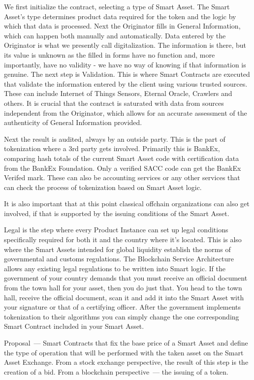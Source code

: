 \documentclass{article}
\begin{document}
\begin{multicols}{2}
We first initialize the contract, selecting a type of Smart Asset. The Smart Asset’s type determines product data required for the token and the logic by which that data is processed. 
Next the Originator fills in General Information, which can happen both manually and automatically. Data entered by the Originator is what we presently call digitalization. The information is there, but its value is unknown as the filled in forms have no function and, more importantly, have no validity - we have no way of knowing if that information is genuine. 
The next step is Validation. This is where Smart Contracts are executed that validate the information entered by the client using various trusted sources. These can include Internet of Things Sensors, Eternal Oracle, Crawlers and others. It is crucial that the contract is saturated with data from sources independent from the Originator, which allows for an accurate assessment of the authenticity of General Information provided. 

Next the result is audited, always by an outside party. This is the part of tokenization where a 3rd party gets involved. Primarily this is BankEx, comparing hash totals of the current Smart Asset code with certification data from the BankEx Foundation. Only a verified SACC code can get the BankEx Verifed mark. These can also be accounting services or any other services that can check the process of tokenization based on Smart Asset logic.

It is also important that at this point classical offchain organizations can also get involved, if that is supported by the issuing conditions of the Smart Asset. 

Legal is the step where every Product Instance can set up legal conditions specifically required for both it and the country where it's located. This is also where the Smart Assets intended for global liquidity establish the norms of governmental and customs regulations. The Blockchain Service Architecture allows any existing legal regulations to be written into Smart logic. If the government of your country demands that you must receive an official document from the town hall for your asset, then you do just that. You head to the town hall, receive the official document, scan it and add it into the Smart Asset with your signature or that of a certifying officer. After the government implements tokenization to their algorithms you can simply change the one corresponding Smart Contract included in your Smart Asset. 

Proposal~--- Smart Contracts that fix the base price of a Smart Asset and define the type of operation that will be performed with the taken asset on the Smart Asset Exchange. From a stock exchange perspective, the result of this step is the creation of a bid. From a blockchain perspective~--- the issuing of a token.


\end{multicols}
\end{document}
